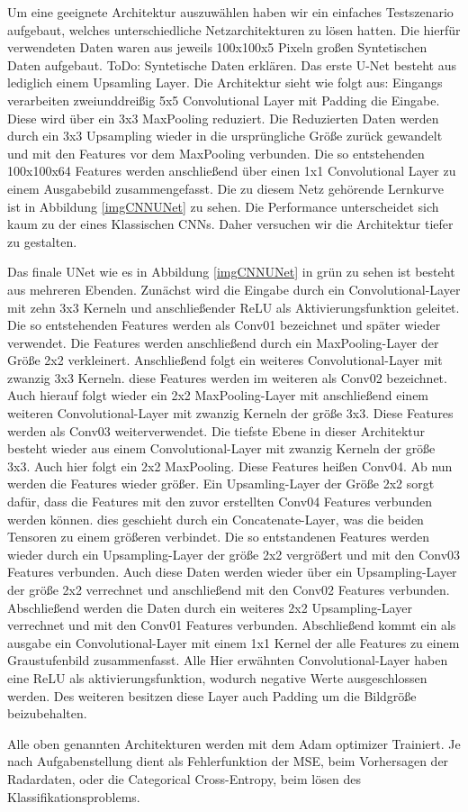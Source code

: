 Um eine geeignete Architektur auszuwählen haben wir ein einfaches Testszenario aufgebaut, welches unterschiedliche Netzarchitekturen zu lösen hatten. Die hierfür verwendeten Daten waren aus jeweils 100x100x5 Pixeln großen Syntetischen Daten aufgebaut.
ToDo: Syntetische Daten erklären.
Das erste U-Net besteht aus lediglich einem Upsamling Layer. Die Architektur sieht wie folgt aus:
Eingangs verarbeiten zweiunddreißig 5x5 Convolutional Layer mit Padding die Eingabe. Diese wird über ein 3x3 MaxPooling reduziert. Die Reduzierten Daten werden durch ein 3x3 Upsampling wieder in die ursprüngliche Größe zurück gewandelt und mit den Features vor dem MaxPooling verbunden. Die so entstehenden 100x100x64 Features werden anschließend über einen 1x1 Convolutional Layer zu einem Ausgabebild zusammengefasst.
Die zu diesem Netz gehörende Lernkurve ist in Abbildung \ref{imgCNNUNet} zu sehen. Die Performance unterscheidet sich kaum zu der eines Klassischen CNNs. Daher versuchen wir die Architektur tiefer zu gestalten.

Das finale UNet wie es in Abbildung \ref{imgCNNUNet} in grün zu sehen ist besteht aus mehreren Ebenden.
Zunächst wird die Eingabe durch ein Convolutional-Layer mit zehn 3x3 Kerneln und anschließender ReLU als Aktivierungsfunktion geleitet. Die so entstehenden Features werden als Conv01 bezeichnet und später wieder verwendet.
Die Features werden anschließend durch ein MaxPooling-Layer der Größe 2x2 verkleinert. Anschließend folgt ein weiteres Convolutional-Layer mit zwanzig 3x3 Kerneln. diese Features werden im weiteren als Conv02 bezeichnet.
Auch hierauf folgt wieder ein 2x2 MaxPooling-Layer mit anschließend einem weiteren Convolutional-Layer mit zwanzig Kerneln der größe 3x3. Diese Features werden als Conv03 weiterverwendet.
Die tiefste Ebene in dieser Architektur besteht wieder aus einem Convolutional-Layer mit zwanzig Kerneln der größe 3x3. Auch hier folgt ein 2x2 MaxPooling. Diese Features heißen Conv04.
Ab nun werden die Features wieder größer. Ein Upsamling-Layer der Größe 2x2 sorgt dafür, dass die Features mit den zuvor erstellten Conv04 Features verbunden werden können. dies geschieht durch ein Concatenate-Layer, was die beiden Tensoren zu einem größeren verbindet. Die so entstandenen Features werden wieder durch ein Upsampling-Layer der größe 2x2 vergrößert und mit den Conv03 Features verbunden. Auch diese Daten werden wieder über ein Upsampling-Layer der größe 2x2 verrechnet und anschließend mit den Conv02 Features verbunden. Abschließend werden die Daten durch ein weiteres 2x2 Upsampling-Layer verrechnet und mit den Conv01 Features verbunden. Abschließend kommt ein als ausgabe ein Convolutional-Layer mit einem 1x1 Kernel der alle Features zu einem Graustufenbild zusammenfasst.
Alle Hier erwähnten Convolutional-Layer haben eine ReLU als aktivierungsfunktion, wodurch negative Werte ausgeschlossen werden. Des weiteren besitzen diese Layer auch Padding um die Bildgröße beizubehalten.

Alle oben genannten Architekturen werden mit dem Adam optimizer Trainiert. Je nach Aufgabenstellung dient als Fehlerfunktion der MSE, beim Vorhersagen der Radardaten, oder die Categorical Cross-Entropy, beim lösen des Klassifikationsproblems.
